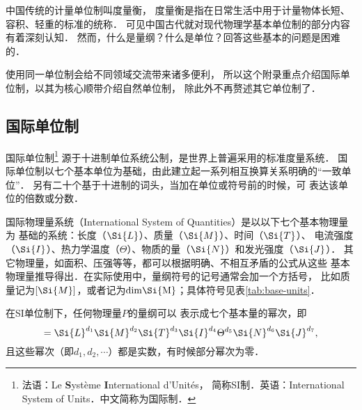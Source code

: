 中国传统的计量单位制叫度量衡，
度量衡是指在日常生活中用于计量物体长短、容积、轻重的标准的统称．
可见中国古代就对现代物理学基本单位制的部分内容有着深刻认知．
然而，什么是量纲？什么是单位？回答这些基本的问题是困难的．

使用同一单位制会给不同领域交流带来诸多便利，
所以这个附录重点介绍国际单位制，以其为核心顺带介绍自然单位制，
除此外不再赘述其它单位制了．

\subsection{国际单位制}
国际单位制{\footnote{法语：Le {\bf S}ystème {\bf I}nternational d'Unités，
        简称SI制．英语：International System of Units．中文简称为国际制．}}
源于十进制单位系统{\kaishu 公制}，是世界上普遍采用的标准度量系统． 
国际单位制以七个基本单位为基础，由此建立起一系列相互换算关系明确的“一致单位”．
另有二十个基于十进制的词头，当加在单位或符号前的时候，可
表达该单位的倍数或分数．


国际物理量系统（International System of Quantities）是以以下七个基本物理量为
基础的系统：长度（$\Si{L}$）、质量（$\Si{M}$）、时间（$\Si{T}$）、
电流强度（$\Si{I}$）、热力学温度（$\Theta$）、物质的量（$\Si{N}$）和发光强度（$\Si{J}$）．
其它物理量，如面积、压强等等，都可以根据明确、不相互矛盾的公式从这些
基本物理量推导得出．在实际使用中，量纲符号的记号通常会加一个方括号，
比如质量记为$[\Si{M}]$，或者记为$\rm{dim} \Si{M}$；具体符号见表\ref{tab:base-units}．


在SI单位制下，任何物理量$P$的量纲可以
表示成七个基本量的幂次，即
\begin{equation} %
    [P]=\Si{L}^{d_1} \Si{M}^{d_2} \Si{T}^{d_3} \Si{I}^{d_4} \Theta^{d_5} \Si{N}^{d_6} \Si{J}^{d_7} ,
\end{equation}
且这些幂次（即$d_1,d_2,\cdots$）都是实数，有时候部分幂次为零．
